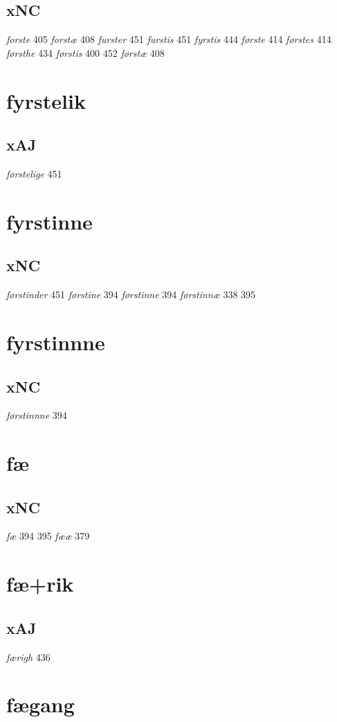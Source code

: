 \documentclass[a4paper,twocolumn]{article}
\begin{document}
\subsection{xNC}
\label{sec:org4c155fd}
\emph{forste} 405 \emph{forstæ} 408 \emph{furster} 451 \emph{furstis} 451 \emph{fyrstis} 444 \emph{første} 414 \emph{førstes} 414 \emph{førsthe} 434 \emph{førstis} 400 452 \emph{førstæ} 408 
\section{fyrstelik}
\label{sec:orgd1d5fc7}
\subsection{xAJ}
\label{sec:org2470b7a}
\emph{førstelige} 451 
\section{fyrstinne}
\label{sec:org522160c}
\subsection{xNC}
\label{sec:org37812b3}
\emph{førstinder} 451 \emph{førstine} 394 \emph{førstinne} 394 \emph{førstinnæ} 338 395 
\section{fyrstinnne}
\label{sec:org5c07393}
\subsection{xNC}
\label{sec:org86b68b6}
\emph{førstinnne} 394 
\section{fæ}
\label{sec:orga380177}
\subsection{xNC}
\label{sec:org997e770}
\emph{fæ} 394 395 \emph{fææ} 379 
\section{fæ+rik}
\label{sec:org6e88fce}
\subsection{xAJ}
\label{sec:orge1c481e}
\emph{færigh} 436 
\section{fægang}
\label{sec:org54f73d4}
\end{document}
